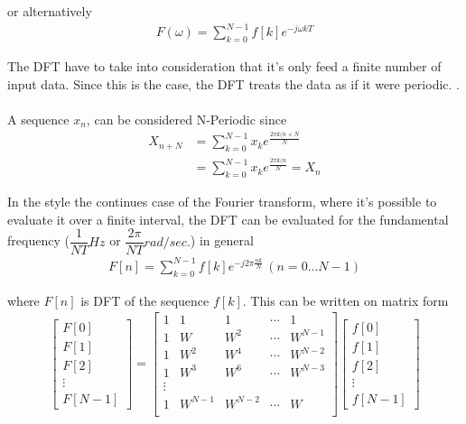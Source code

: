 or alternatively
\begin{align*}
	F(\omega) = \sum_{k=0}^{N-1}f[k]e^{-j\omega k T}
\end{align*} 


The DFT have to take into consideration that it's only feed a finite number of input data. Since this is the case, the DFT treats the data as if it were periodic.
.
\\\\
A sequence $x_n$, can be considered N-Periodic since 
\begin{align*}
	X_{n+N} 
	&= \sum_{k=0}^{N-1}x_k e^{\frac{2 \pi k (n+N}{N}}\\
	&= \sum_{k=0}^{N-1}x_k e^{\frac{2 \pi k (n}{N}} = X_n
\end{align*} 

In the style the continues case of the Fourier transform, where it's possible to evaluate it over a finite interval, the DFT can be evaluated for the fundamental frequency ($\dfrac{1}{NT} Hz$ or $\dfrac{2\pi}{NT}rad/sec.$) in general
\begin{align*}
	F[n] = \sum_{k=0}^{N-1}f[k]e^{-j2\pi\frac{nk}{N}} \, (n = 0\ldots N-1)
\end{align*}

where $F[n]$ is DFT of the sequence $f[k]$.
This can be written on matrix form
\begin{align*}
	\begin{bmatrix}
		F[0]\\ F[1]\\ F[2]\\ \vdots \\ F[N-1]
	\end{bmatrix}
	=
	\begin{bmatrix}
		1 & 1 	& 1   	& \cdots & 1\\
		1 & W 	& W^2 	& \cdots & W^{N-1}\\
		1 & W^2	& W^4	& \cdots & W^{N-2}\\
		1 & W^3	& W^6	& \cdots & W^{N-3}\\
		\vdots\\
		1 & W^{N-1}	& W^{N-2}	& \cdots & W\\
	\end{bmatrix}
	\begin{bmatrix}
		f[0]\\ f[1]\\ f[2]\\ \vdots \\ f[N-1]
	\end{bmatrix}
\end{align*}

